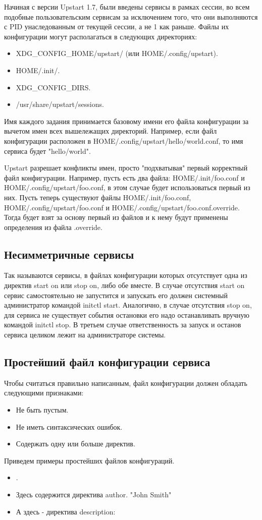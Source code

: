 Начиная с версии Upstart 1.7, были введены сервисы в рамках сессии, во всем подобные пользовательским сервисам за исключением того, что они выполняются с PID унаследованным от текущей сессии, а не 1 как
раньше. 
Файлы их конфигурации могут располагаться в следующих директориях: \begin{itemize}
\item \textdollar XDG\_CONFIG\_HOME/upstart/ (или \textdollar HOME/.config/upstart).
\item \textdollar HOME/.init/.
\item \textdollar XDG\_CONFIG\_DIRS.
\item /usr/share/upstart/sessions.
\end{itemize}
Имя каждого задания принимается базовому имени его файла конфигурации за вычетом имен всех вышележащих директорий. Например, если файл конфигурации расположен в \textdollar HOME/.config/upstart/hello/world.conf, то имя сервиса будет "hello/world".

Upstart разрешает конфликты имен, просто "подхватывая" первый корректный файл конфигурации. Например, пусть есть два файла: \textdollar HOME/.init/foo.conf и \textdollar HOME/.config/upstart/foo.conf, 
в этом случае будет использоваться первый из них. Пусть теперь существуют файлы \textdollar HOME/.init/foo.conf, \textdollar HOME/.config/upstart/foo.conf и \textdollar HOME/.config/upstart/foo.conf.override. Тогда будет взят за основу первый из файлов и к нему будут применены определения из файла .override.
\subsection{Несимметричные сервисы}
Так называются сервисы, в файлах конфигурации которых отсутствует одна из директив start on или stop on, либо обе вместе. В случае отсутствия start on сервис самостоятельно не запустится и запускать его должен системный администратор командой initctl start. Аналогично, в случае отсутствия stop on, для сервиса не существует события остановки его надо останавливать вручную командой initctl stop. В третьем случае ответственность за запуск и останов сервиса целиком лежит на администраторе системы.
\subsection{Простейший файл конфигурации сервиса}
Чтобы считаться правильно написанным, файл конфигурации должен обладать следующими признаками: \begin{itemize}
\item Не быть пустым.
\item Не иметь синтаксических ошибок.
\item Содержать одну или больше директив.
\end{itemize}
Приведем примеры простейших файлов конфигураций. 
\begin{itemize}
\item {}.
\item Здесь содержится директива author.  {"John Smith"}  
\item А здесь - директива description:  
\end{itemize}
